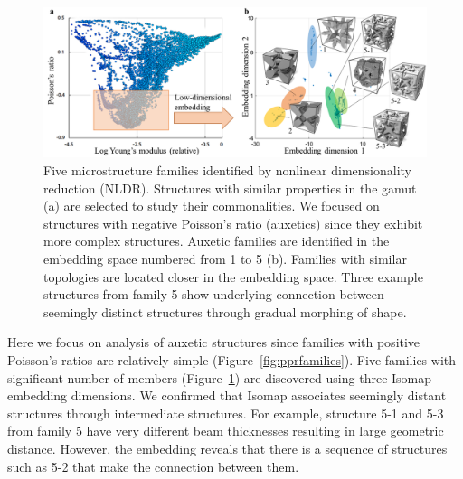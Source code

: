 \begin{figure}
\includegraphics[width=0.95\columnwidth]{images/fiveFamilies.png}
\caption{Five microstructure families identified by nonlinear dimensionality reduction (NLDR). Structures with similar properties in the gamut (a) are selected to study their commonalities. We focused on structures with negative Poisson's ratio (auxetics) since they exhibit more complex structures. Auxetic families are identified in the embedding space numbered from 1 to 5 (b). Families with similar topologies are located closer in the embedding space. Three example structures from family 5 show underlying connection between seemingly distinct structures through gradual morphing of shape.}
\label{fig:families}
\end{figure}
Here we focus on analysis of auxetic structures since families with positive Poisson's ratios are relatively simple (Figure~\ref{fig:pprfamilies}). Five families with significant number of members (Figure~\ref{fig:families}) are discovered using three Isomap embedding dimensions. We confirmed that Isomap associates seemingly distant structures through intermediate structures. For example, structure 5-1 and 5-3 from family 5 have very different beam thicknesses resulting in large geometric distance. However, the embedding reveals that there is a sequence of structures such as 5-2 that make the connection between them.

